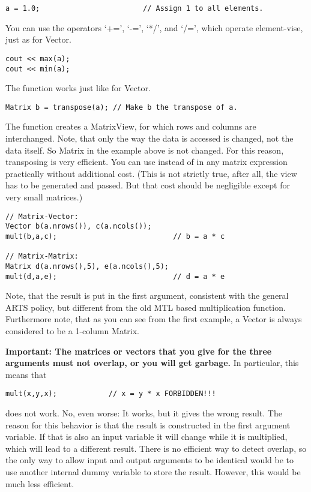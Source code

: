 \begin{verbatim}
a = 1.0;                        // Assign 1 to all elements.
\end{verbatim}


You can use the operators `+=', `-=', `*/', and `/=', which operate
element-vise, just as for Vector.

\begin{verbatim}
cout << max(a);
cout << min(a);
\end{verbatim}


The function  works just like for Vector.

\begin{verbatim}
Matrix b = transpose(a); // Make b the transpose of a.
\end{verbatim}

The function  creates a MatrixView, for which rows and
columns are interchanged. Note, that only the way the data is accessed
is changed, not the data itself. So Matrix  in the example
above is not changed. For this reason, transposing is very efficient.
You can use  instead of  in any matrix
expression practically without additional cost. (This is not strictly
true, after all, the view has to be generated and passed. But that
cost should be negligible except for very small matrices.)

\begin{verbatim}
// Matrix-Vector:
Vector b(a.nrows()), c(a.ncols());
mult(b,a,c);                           // b = a * c

// Matrix-Matrix:
Matrix d(a.nrows(),5), e(a.ncols(),5);
mult(d,a,e);                           // d = a * e
\end{verbatim}

Note, that the result is put in the first argument, consistent with
the general ARTS policy, but different from the old MTL based
multiplication function. Furthermore note, that as you can see from
the first example, a Vector is always considered to be a 1-column
Matrix. 

\textbf{Important: The matrices or vectors that you give for the three
arguments must not overlap, or you will get garbage.} In particular,
this means that 
\begin{verbatim}
mult(x,y,x);            // x = y * x FORBIDDEN!!!
\end{verbatim}
does not work. No, even worse: It works, but it gives the wrong
result.  The reason for this behavior is that the result is
constructed in the first argument variable. If that is also an input
variable it will change while it is multiplied, which will lead to a
different result.  There is no efficient way to detect overlap, so the
only way to allow input and output arguments to be identical would be
to use another internal dummy variable to store the result. However,
this would be much less efficient.

